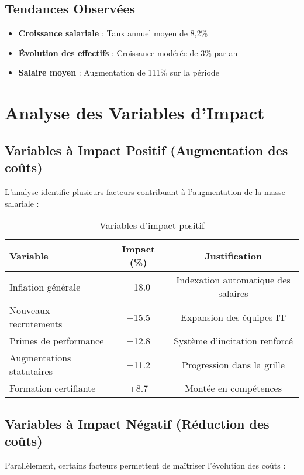 \documentclass[12pt,a4paper]{article}
\begin{document}
\subsection{Tendances Observées}
\begin{itemize}
    \item \textbf{Croissance salariale} : Taux annuel moyen de 8,2\%
    \item \textbf{Évolution des effectifs} : Croissance modérée de 3\% par an
    \item \textbf{Salaire moyen} : Augmentation de 111\% sur la période
\end{itemize}

\newpage

\section{Analyse des Variables d'Impact}

\subsection{Variables à Impact Positif (Augmentation des coûts)}
L'analyse identifie plusieurs facteurs contribuant à l'augmentation de la masse salariale :

\begin{table}[H]
\centering
\caption{Variables d'impact positif}
\begin{tabular}{@{}lcc@{}}
\toprule
\textbf{Variable} & \textbf{Impact (\%)} & \textbf{Justification} \\
\midrule
Inflation générale & +18.0 & Indexation automatique des salaires \\
Nouveaux recrutements & +15.5 & Expansion des équipes IT \\
Primes de performance & +12.8 & Système d'incitation renforcé \\
Augmentations statutaires & +11.2 & Progression dans la grille \\
Formation certifiante & +8.7 & Montée en compétences \\
\bottomrule
\end{tabular}
\end{table}

\subsection{Variables à Impact Négatif (Réduction des coûts)}
Parallèlement, certains facteurs permettent de maîtriser l'évolution des coûts :
\end{document}
